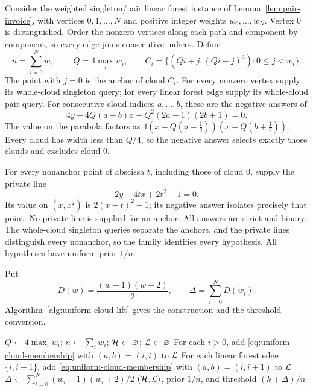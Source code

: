 Consider the weighted singleton/pair linear forest instance of
Lemma~\ref{lem:pair-invoice}, with vertices $0,1,\ldots,N$ and
positive integer weights $w_0,\ldots,w_N$. Vertex $0$ is
distinguished. Order the nonzero vertices along each path and
component by component, so every edge joins consecutive indices. Define
\[
 n=\sum_{i=0}^N w_i,\qquad Q=4\max_i w_i,\qquad
 C_i=\{(Qi+j,(Qi+j)^2):0\le j<w_i\}.
\]
The point with $j=0$ is the anchor of cloud $C_i$.
For every nonzero vertex supply its whole-cloud singleton query;
for every linear forest edge supply its whole-cloud pair query.
For consecutive cloud indices $a,\ldots,b$, these are the negative
answers of
\begin{equation}\label{eq:uniform-cloud-membership}
 4y-4Q(a+b)x+Q^2(2a-1)(2b+1)=0.
\end{equation}
The value on the parabola factors as
$4(x-Q(a-\tfrac12))(x-Q(b+\tfrac12))$.
Every cloud has width less than $Q/4$, so the negative answer
selects exactly those clouds and excludes cloud $0$.

For every nonanchor point of abscissa $t$, including those of
cloud $0$, supply the private line
\[
 2y-4tx+2t^2-1=0.
\]
Its value on $(x,x^2)$ is $2(x-t)^2-1$; its negative answer
isolates precisely that point. No private line is supplied for
an anchor. All answers are strict and binary.
The whole-cloud singleton queries separate the anchors, and
the private lines distinguish every nonanchor, so the family
identifies every hypothesis. All hypotheses have uniform prior $1/n$.

Put
\begin{equation}\label{eq:uniform-cloud-offset}
 D(w)=\frac{(w-1)(w+2)}2,\qquad
 \Delta=\sum_{i=0}^N D(w_i).
\end{equation}
Algorithm~\ref{alg:uniform-cloud-lift} gives the construction and
the threshold conversion.

\begin{algorithm}[H]
\caption{Uniform cloud replacement of a weighted linear forest instance}
\label{alg:uniform-cloud-lift}
$Q\gets4\max_i w_i$; $n\gets\sum_iw_i$;
$\mathcal H\gets\varnothing$; $\mathcal L\gets\varnothing$\;
For each $i>0$, add \eqref{eq:uniform-cloud-membership}
with $(a,b)=(i,i)$ to $\mathcal L$\;
For each linear forest edge $\{i,i+1\}$, add
\eqref{eq:uniform-cloud-membership} with $(a,b)=(i,i+1)$ to $\mathcal L$\;
$\Delta\gets\sum_{i=0}^N(w_i-1)(w_i+2)/2$\;
\KwRet $(\mathcal H,\mathcal L)$, prior $1/n$, and threshold $(k+\Delta)/n$\;
\end{algorithm}

